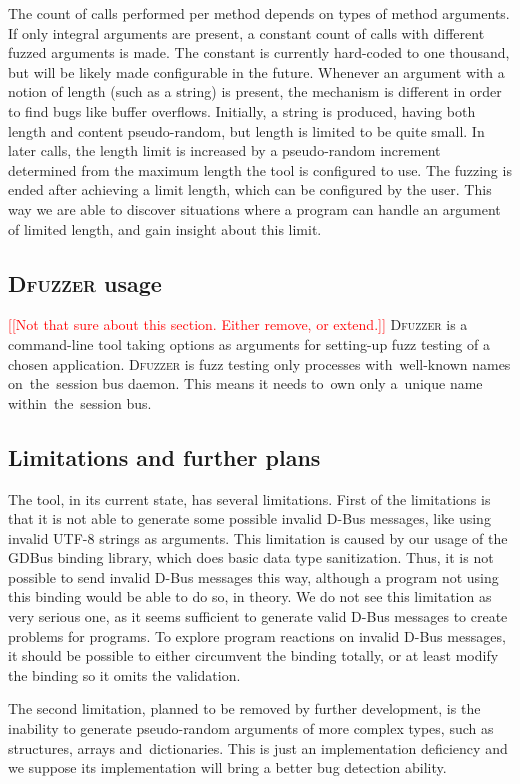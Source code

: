 \documentclass[conference]{IEEEtran}
\newcommand{\addtodo}[1]{\textcolor{red}{[[#1]]}}
\begin{document}
The count of calls performed per method depends on types of method arguments.
If only integral arguments are present, a constant count of calls with
different fuzzed arguments is made. The constant is currently hard-coded to one
thousand, but will be likely made configurable in the future.  Whenever an
argument with a notion of length (such as a string) is present, the mechanism
is different in order to find bugs like buffer overflows. Initially, a string
is produced, having both length and content pseudo-random, but length is
limited to be quite small. In later calls, the length limit is increased by a
pseudo-random increment determined from the maximum length the tool is
configured to use. The fuzzing is ended after achieving a limit length, which
can be configured by the user. This way we are able to discover situations
where a program can handle an argument of limited length, and gain insight
about this limit.


\subsection{\textsc{Dfuzzer} usage}
\addtodo{Not that sure about this section. Either remove, or extend.}
\textsc{Dfuzzer} is a command-line tool taking options as arguments for setting-up fuzz
testing of a chosen application. \textsc{Dfuzzer} is fuzz testing only processes
with~well-known names on~the~session bus daemon. This means it needs to~own
only a~unique name within~the~session bus.


\subsection{Limitations and further plans}
The tool, in its current state, has several limitations. First of the
limitations is that it is not able to generate some possible invalid D-Bus
messages, like using invalid UTF-8 strings as arguments. This limitation is
caused by our usage of the GDBus binding library, which does basic data type
sanitization. Thus, it is not possible to send invalid D-Bus messages this way,
although a program not using this binding would be able to do so, in theory. We
do not see this limitation as very serious one, as it seems sufficient to
generate valid D-Bus messages to create problems for programs. To explore
program reactions on invalid D-Bus messages, it should be possible to either
circumvent the binding totally, or at least modify the binding so it omits the
validation.


The second limitation, planned to be removed by further development, is the
inability to generate pseudo-random arguments of more complex types, such as 
structures, arrays and~dictionaries. This is just an implementation deficiency
and we suppose its implementation will bring a better bug detection ability. 
\end{document}
